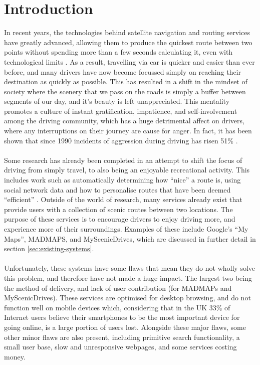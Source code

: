 \section{Introduction}
In recent years, the technologies behind satellite navigation and routing services have greatly advanced, allowing them to produce the quickest route between two points without spending more than a few seconds calculating it, even with technological limits \cite{lou2009map}. As a result, travelling via car is quicker and easier than ever before, and many drivers have now become focussed simply on reaching their destination as quickly as possible. This has resulted in a shift in the mindset of society where the scenery that we pass on the roads is simply a buffer between segments of our day, and it's beauty is left unappreciated. This mentality promotes a  culture of instant gratification, impatience, and self-involvement among the driving community, which has a huge detrimental affect on drivers, where any interruptions on their journey are cause for anger. In fact, it has been shown that since 1990 incidents of aggression during driving has risen 51\% \cite{vest1997road}. \ \\
\ \\
Some research has already been completed in an attempt to shift the focus of driving from simply travel, to also being an enjoyable recreational activity. This includes work such as automatically determining how ``nice'' a route is, using social network data \cite{peregrino2012mapping}\cite{van2011time} and how to personalise routes that have been deemed ``efficient'' \cite{chen2011discovering}. Outside of the world of research, many services already exist that provide users with a collection of scenic routes between two locations. The purpose of these services is to encourage drivers to enjoy driving more, and experience more of their surroundings. Examples of these include Google's ``My Maps''\cite{url2015gmaps}, MADMAPS\cite{url2015madmaps}, and MyScenicDrives\cite{url2015myscenicdrives}, which are discussed in further detail in section \ref{sec:existing-systems}.\ \\
\ \\
Unfortunately, these systems have some flaws that mean they do not wholly solve this problem, and therefore have not made a huge impact. The largest two being the method of delivery, and lack of user contribution (for MADMAPs and MyScenicDrives). These services are optimised for desktop browsing, and do not function well on mobile devices which, considering that in the UK 33\% of Internet users believe their smartphones to be the most important device for going online\cite{ofcom2015comms}, is a large portion of users lost. Alongside these major flaws, some other minor flaws are also present, including primitive search functionality, a small user base, slow and unresponsive webpages, and some services costing money.\ \\
